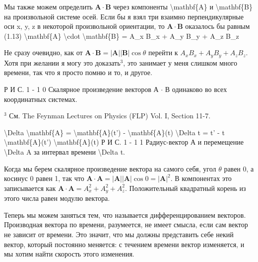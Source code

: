 \documentclass[10pt,oneside]{article}
\newcommand{\TipsRunning}[1]{\par\vspace{2bp}{\centering\footnotesize #1\par}\vspace{2bp}}
\newcommand{\TipsSubsection}[1]{\par\vspace{6bp}{\normalsize\bfseries #1\par}\vspace{2bp}}
\begin{document}
Мы также можем определить \(\mathbf{A} \cdot \mathbf{B}\) через компоненты \textbackslash{}mathbf\{A\} и \textbackslash{}mathbf\{B\} на произвольной системе осей. Если бы я взял три взаимно перпендикулярные оси x, y, z в некоторой произвольной ориентации, то \(\mathbf{A} \cdot \mathbf{B}\) оказалось бы равным (1.13) \textbackslash{}mathbf\{A\} \textbackslash{}cdot \textbackslash{}mathbf\{B\} = A\_x B\_x + A\_y B\_y + A\_z B\_z\par

Не сразу очевидно, как от \(\mathbf{A} \cdot \mathbf{B} = |\mathbf{A}| |\mathbf{B}| \cos\theta\) перейти к \(A_x B_x + A_y B_y + A_z B_z\). Хотя при желании я могу это доказать\(^3\), это занимает у меня слишком много времени, так что я просто помню и то, и другое.\par

Р И С. 1 - 1 0 Скалярное произведение векторов А \ensuremath{\cdot} В одинаково во всех координатных системах.\par

\(^3\) См. The Feynman Lectures on Physics (FLP) Vol. I, Section 11-7.\par

\TipsRunning{П О Д Г О Т О В И Т Е Л Ь Н Ы Й   М А Т Е Р И А Л • 4 9}

\textbackslash{}Delta \textbackslash{}mathbf\{A\} = \textbackslash{}mathbf\{A\}(t') - \textbackslash{}mathbf\{A\}(t) \textbackslash{}Delta t = t' - t \textbackslash{}mathbf\{A\}(t') \textbackslash{}mathbf\{A\}(t) Р И С. 1 - 1 1 Радиус-вектор А и перемещение \textbackslash{}Delta A за интервал времени \textbackslash{}Delta t.\par

Когда мы берем скалярное произведение вектора на самого себя, угол \(\theta\) равен 0, а косинус 0 равен 1, так что \(\mathbf{A} \cdot \mathbf{A} = |\mathbf{A}| |\mathbf{A}| \cos 0 = |\mathbf{A}|^2\). В компонентах это записывается как \(\mathbf{A} \cdot \mathbf{A} = A_x^2 + A_y^2 + A_z^2\). Положительный квадратный корень из этого числа равен модулю вектора.\par

\TipsSubsection{1-7 Дифференцирование векторов}

Теперь мы можем заняться тем, что называется дифференцированием векторов. Производная вектора по времени, разумеется, не имеет смысла, если сам вектор не зависит от времени. Это значит, что мы должны представить себе некий вектор, который постоянно меняется: с течением времени вектор изменяется, и мы хотим найти скорость этого изменения.\par
\end{document}
